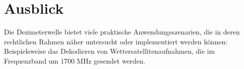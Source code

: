 \section{Ausblick}
Die Dezimeterwelle bietet viele praktische Anwendungsszenarien, die in deren rechtlichen Rahmen näher untersucht oder implementiert werden können:
Beispielsweise das Dekodieren von Wettersatellitenaufnahmen, die im Frequenzband um 1700 MHz gesendet werden. 